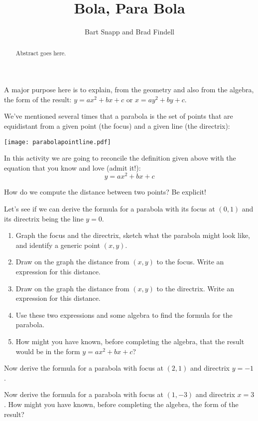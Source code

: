 \documentclass{ximera}
\title{Bola, Para Bola}
\author{Bart Snapp and Brad Findell}
\begin{document}
\begin{abstract}
Abstract goes here.  
\end{abstract}
\maketitle

\begin{teachingnote}
A major purpose here is to explain, from the geometry and also from the algebra, the form of the result:
$y = ax^2 + bx + c$ or $x = ay^2 + by + c$.  
\end{teachingnote}
We've mentioned several times that a parabola is the set of points
that are equidistant from a given point (the focus) and a given line
(the directrix):
\begin{image}
\texttt{[image: parabolapointline.pdf]}
\end{image}
In this activity we are going to reconcile the definition given
above with the equation that you know and love (admit it!):
\[
y = ax^2 + bx + c
\]

\begin{problem}
How do we compute the distance between two points? Be explicit!
\end{problem}

\begin{problem}
Let's see if we can derive the formula for a parabola with its focus at $(0,1)$ and its directrix being the line $y=0$.
\begin{enumerate}
\item Graph the focus and the directrix, sketch what the parabola might look like, and identify a generic point $(x, y)$.  
\item Draw on the graph the distance from $(x,y)$ to the focus.  Write an expression for this distance.  
\item Draw on the graph the distance from $(x,y)$ to the directrix.  Write an expression for this distance.  
\item Use these two expressions and some algebra to find the formula for the parabola. 
\vspace{.5in}
\item How might you have known, before completing the algebra, that the result would be in the form 
$y = ax^2 + bx + c$? 
\end{enumerate}
\end{problem}
\vspace{.5in}

\begin{problem}
Now derive the formula for a parabola with focus at $(2,1)$ and directrix $y=-1$.
\end{problem}
\vspace{1in}

\begin{problem}
Now derive the formula for a parabola with focus at $(1,-3)$ and directrix $x=3$.  How might you have known, before completing the algebra, the form of the result?   
\end{problem}
\end{document}
